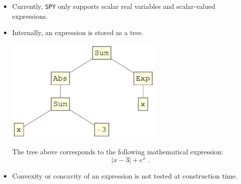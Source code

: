 \begin{itemize}
\item Currently, \verb'SPY' only supports scalar real variables and scalar-valued expressions.
\item Internally, an expression is stored as a tree.
\begin{center}
\includegraphics[width=0.6\textwidth]{poster/expr}
\end{center}
The tree above corresponds to the following mathematical expression:
\begin{equation*}
|x-3|+e^x \; .
\end{equation*}
\item Convexity or concavity of an expression is not tested at construction time.
\end{itemize}
